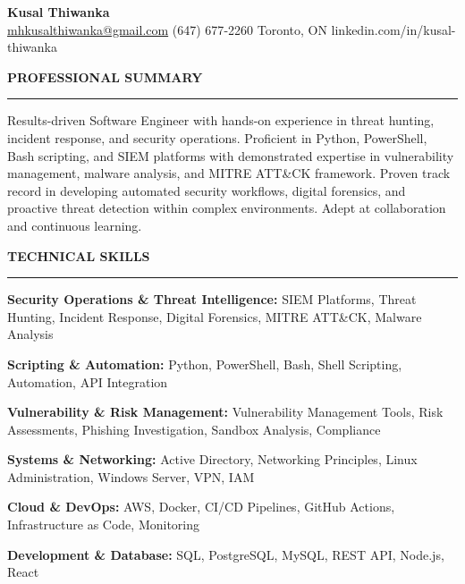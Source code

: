 \documentclass[10pt,letterpaper]{article}
\begin{document}
\begin{center}
{\LARGE\textbf{Kusal Thiwanka}}\\[3pt]
\href{mailto:mhkusalthiwanka@gmail.com}{mhkusalthiwanka@gmail.com}\hspace{2em}%
(647) 677{-}2260\hspace{2em}%
Toronto, ON\hspace{2em}
linkedin.com/in/kusal-thiwanka
\end{center}

\vspace{6pt}

\textbf{PROFESSIONAL SUMMARY}\\[-8pt]
\noindent\rule{\textwidth}{1pt}

\vspace{-2pt}

Results-driven Software Engineer with hands-on experience in threat hunting, incident response, and security operations. Proficient in Python, PowerShell, Bash scripting, and SIEM platforms with demonstrated expertise in vulnerability management, malware analysis, and MITRE ATT\&CK framework. Proven track record in developing automated security workflows, digital forensics, and proactive threat detection within complex environments. Adept at collaboration and continuous learning.

\vspace{8pt}

\textbf{TECHNICAL SKILLS}\\[-8pt]
\noindent\rule{\textwidth}{1pt}

\vspace{-2pt}

\textbf{Security Operations \& Threat Intelligence:} SIEM Platforms, Threat Hunting, Incident Response, Digital Forensics, MITRE ATT\&CK, Malware Analysis

\textbf{Scripting \& Automation:} Python, PowerShell, Bash, Shell Scripting, Automation, API Integration

\textbf{Vulnerability \& Risk Management:} Vulnerability Management Tools, Risk Assessments, Phishing Investigation, Sandbox Analysis, Compliance

\textbf{Systems \& Networking:} Active Directory, Networking Principles, Linux Administration, Windows Server, VPN, IAM

\textbf{Cloud \& DevOps:} AWS, Docker, CI/CD Pipelines, GitHub Actions, Infrastructure as Code, Monitoring

\textbf{Development \& Database:} SQL, PostgreSQL, MySQL, REST API, Node.js, React
\end{document}
